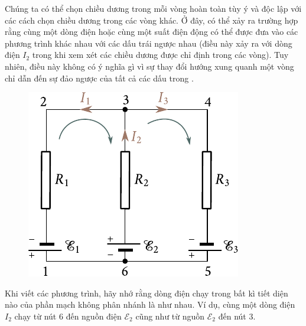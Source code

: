 Chúng ta có thể chọn chiều dương trong mỗi vòng hoàn toàn tùy ý và độc lập với các cách chọn chiều dương trong các vòng khác. Ở đây, có thể xảy ra trường hợp rằng cùng một dòng điện hoặc cùng một suất điện động có thể được đưa vào các phương trình khác nhau với các dấu trái ngược nhau (điều này xảy ra với dòng điện $I_2$ trong  khi xem xét các chiều dương được chỉ định trong các vòng). Tuy nhiên, điều này không có ý nghĩa gì vì sự thay đổi hướng xung quanh một vòng chỉ dẫn đến sự đảo ngược của tất cả các dấu trong .

\begin{figure}[!htb]
	\begin{center}
		\includegraphics[scale=1]{figures/ch_05/fig_5_9.pdf}
		\caption[]{}
		\label{fig:5_9}
	\end{center}
	\vspace{-0.8cm}
\end{figure}

Khi viết các phương trình, hãy nhớ rằng dòng điện chạy trong bất kì tiết diện nào của phần mạch không phân nhánh là như nhau. Ví dụ, cùng một dòng điện $I_2$ chạy từ nút $6$ đến nguồn điện $\mathcal{E}_2$ cũng như từ nguồn $\mathcal{E}_2$ đến nút $3$.

